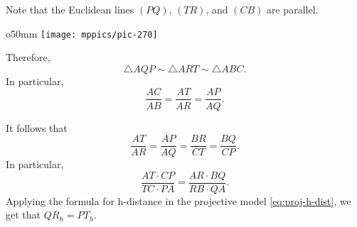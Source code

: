 Note that the Euclidean lines $(PQ)$, $(TR)$, and $(CB)$ are parallel.

\begin{wrapfigure}{o}{50mm}
\centering
\texttt{[image: mppics/pic-270]}
\end{wrapfigure}

Therefore, 
\[\triangle AQP\sim \triangle ART \sim\triangle ABC.\]
In particular,
\[\frac{AC}{AB}=\frac{AT}{AR}=\frac{AP}{AQ}.\]

It follows that
\[\frac{AT}{AR}=\frac{AP}{AQ}=\frac{BR}{CT}=\frac{BQ}{CP}.\]
In particular,
\[\frac{AT\cdot CP}{TC\cdot PA}=\frac{AR\cdot BQ}{RB\cdot QA}.\]
Applying the formula for h-distance in the projective model \ref{eq:proj-h-dist}, we get that $QR_h=PT_h$.
\qeds
 

